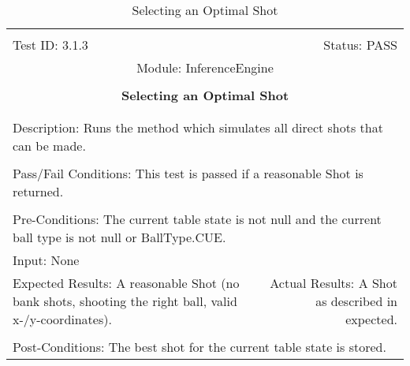 \documentclass[titlepage]{article}
\begin{document}
\begin{center}
\begin{table}[h!]
\begin{tabular}{|l r|}\hline&\\[-2mm]
	Test ID: 3.1.3	&Status: PASS\\[-3mm]
	\multicolumn{2}{|c|}{Module: InferenceEngine}\\&\\
	\multicolumn{2}{|c|}{\textbf{\large{Selecting an Optimal Shot}}}\\&\\\hline&\\[-3mm]
	\multicolumn{2}{|p{\textwidth}|}{Description: Runs the method which simulates all direct shots that can be made.}\\[1mm]\hline&\\[-3mm]
	\multicolumn{2}{|p{\textwidth}|}{Pass/Fail Conditions: This test is passed if a reasonable Shot is returned.}\\[1mm]\hline&\\[-3mm]
	\multicolumn{2}{|p{\textwidth}|}{Pre-Conditions: The current table state is not null and the current ball type is not null or BallType.CUE.}\\[4mm]
	\multicolumn{2}{|p{\textwidth}|}{Input: None}\\[2mm]\hline
	\multicolumn{1}{|p{0.49\textwidth}}{Expected Results: A reasonable Shot (no bank shots, shooting the right ball, valid x-/y-coordinates).}	&\multicolumn{1}{|p{0.45\textwidth}|}{Actual Results: A Shot as described in expected.}\\\hline&\\[-3mm]
	\multicolumn{2}{|p{\textwidth}|}{Post-Conditions: The best shot for the current table state is stored.}\\\hline
\end{tabular}
\caption{Selecting an Optimal Shot}
\end{table}
\end{center}
\newpage
\end{document}

